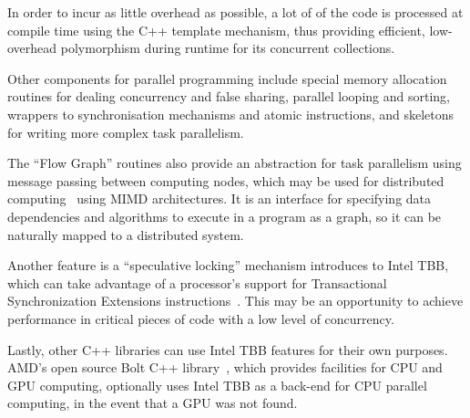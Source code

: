 In order to incur as little overhead as possible, a lot of of the code is processed at compile time using the C++ template mechanism, thus providing efficient, low-overhead polymorphism during runtime for its concurrent collections.

Other components for parallel programming include special memory allocation routines for dealing concurrency and false sharing, parallel looping and sorting, wrappers to synchronisation mechanisms and atomic instructions, and skeletons for writing more complex task parallelism.

The ``Flow Graph'' routines also provide an abstraction for task parallelism using message passing between computing nodes, which may be used for \gls{distributed computing}~\cite{robison2012parallel} using MIMD architectures. It is an interface for specifying data dependencies and algorithms to execute in a program as a graph, so it can be naturally mapped to a distributed system.

Another feature is a ``speculative locking'' mechanism introduces to Intel TBB, which can take advantage of a processor's support for  Transactional Synchronization Extensions instructions~\cite{yoo2013performance}. This may be an opportunity to achieve performance in critical pieces of code with a low level of concurrency.

Lastly, other C++ libraries can use Intel TBB features for their own purposes. AMD's open source Bolt C++ library~\cite{10_amd_2015}, which provides facilities for CPU and GPU computing, optionally uses Intel TBB as a back-end for CPU parallel computing, in the event that a GPU was not found.






